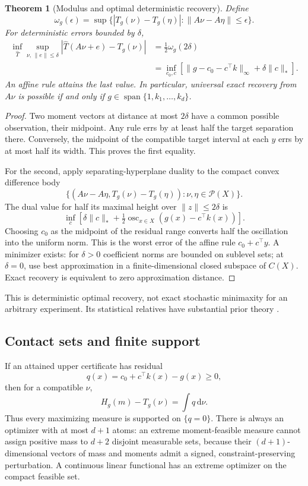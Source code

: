 \documentclass[11pt]{article}
\numberwithin{equation}{section}
\newtheorem{theorem}{Theorem}[section]
\theoremstyle{definition}
\theoremstyle{remark}
\newcommand{\Prob}{\mathcal P}
\newcommand{\osc}{\operatorname{osc}}
\newcommand{\Span}{\operatorname{span}}
\newcommand{\dd}{\,\mathrm d}
\begin{document}
\begin{theorem}[Modulus and optimal deterministic recovery]\label{thm:minimax}
Define
\[
 \omega_g(\epsilon)=\sup\{|T_g(\nu)-T_g(\eta)|:
                   \|A\nu-A\eta\|\le\epsilon\}.
\]
For deterministic errors bounded by $\delta$,
\begin{align}\label{eq:detminimax}
 \inf_{\widehat T}\sup_{\nu,\,\|e\|\le\delta}
 |\widehat T(A\nu+e)-T_g(\nu)|
 &=\tfrac12\omega_g(2\delta)\\
 &=\inf_{c_0,c}\left[
 \|g-c_0-c^\top k\|_\infty+\delta\|c\|_*\right].\nonumber
\end{align}
An affine rule attains the last value. In particular, universal exact recovery from $A\nu$ is possible if and only if $g\in\Span\{1,k_1,\ldots,k_d\}$.
\end{theorem}
\begin{proof}
Two moment vectors at distance at most $2\delta$ have a common possible observation, their midpoint. Any rule errs by at least half the target separation there. Conversely, the midpoint of the compatible target interval at each $y$ errs by at most half its width. This proves the first equality.

For the second, apply separating-hyperplane duality to the compact convex difference body
\[
 \{(A\nu-A\eta,T_g(\nu)-T_g(\eta)):\nu,\eta\in\Prob(X)\}.
\]
The dual value for half its maximal height over $\|z\|\le2\delta$ is
\[
 \inf_c\left[\delta\|c\|_*+\tfrac12\osc_{x\in X}(g(x)-c^\top k(x))\right].
\]
Choosing $c_0$ as the midpoint of the residual range converts half the oscillation into the uniform norm. This is the worst error of the affine rule $c_0+c^\top y$. A minimizer exists: for $\delta>0$ coefficient norms are bounded on sublevel sets; at $\delta=0$, use best approximation in a finite-dimensional closed subspace of $C(X)$. Exact recovery is equivalent to zero approximation distance.
\end{proof}
This is deterministic optimal recovery, not exact stochastic minimaxity for an arbitrary experiment. Its statistical relatives have substantial prior theory \cite{Donoho1994,PolyanskiyWu2019}.

\subsection{Contact sets and finite support}
If an attained upper certificate has residual
\[
 q(x)=c_0+c^\top k(x)-g(x)\ge0,
\]
then for a compatible $\nu$,
\[
 H_g(m)-T_g(\nu)=\int q\dd\nu.
\]
Thus every maximizing measure is supported on $\{q=0\}$. There is always an optimizer with at most $d+1$ atoms: an extreme moment-feasible measure cannot assign positive mass to $d+2$ disjoint measurable sets, because their $(d+1)$-dimensional vectors of mass and moments admit a signed, constraint-preserving perturbation. A continuous linear functional has an extreme optimizer on the compact feasible set.
\end{document}
